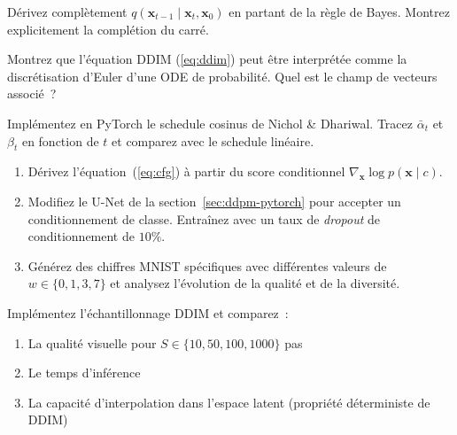 \begin{exercice}
\label{exo:posterior}
D\'erivez compl\`etement $q(\mathbf{x}_{t-1} \mid \mathbf{x}_t, \mathbf{x}_0)$
en partant de la r\`egle de Bayes. Montrez explicitement la compl\'etion
du carr\'e.
\end{exercice}

\begin{exercice}
\label{exo:ddim-ode}
Montrez que l'\'equation DDIM (\ref{eq:ddim}) peut \^etre interpr\'et\'ee comme
la discr\'etisation d'Euler d'une ODE de probabilit\'e. Quel est le champ
de vecteurs associ\'e~?
\end{exercice}

\begin{exercice}
\label{exo:cosine-schedule}
Impl\'ementez en PyTorch le schedule cosinus de Nichol \& Dhariwal.
Tracez $\bar{\alpha}_t$ et $\beta_t$ en fonction de $t$ et comparez
avec le schedule lin\'eaire.
\end{exercice}

\begin{exercice}
\label{exo:cfg}
\begin{enumerate}
    \item D\'erivez l'\'equation~(\ref{eq:cfg}) \`a partir du score conditionnel
          $\nabla_{\mathbf{x}} \log p(\mathbf{x} \mid c)$.
    \item Modifiez le U-Net de la section~\ref{sec:ddpm-pytorch} pour accepter
          un conditionnement de classe. Entra\^inez avec un taux de
          \emph{dropout} de conditionnement de $10\%$.
    \item G\'en\'erez des chiffres MNIST sp\'ecifiques avec diff\'erentes
          valeurs de $w \in \{0, 1, 3, 7\}$ et analysez l'\'evolution
          de la qualit\'e et de la diversit\'e.
\end{enumerate}
\end{exercice}

\begin{exercice}
\label{exo:ddpm-vs-ddim}
Impl\'ementez l'\'echantillonnage DDIM et comparez~:
\begin{enumerate}
    \item La qualit\'e visuelle pour $S \in \{10, 50, 100, 1000\}$ pas
    \item Le temps d'inf\'erence
    \item La capacit\'e d'interpolation dans l'espace latent (propri\'et\'e
          d\'eterministe de DDIM)
\end{enumerate}
\end{exercice}
